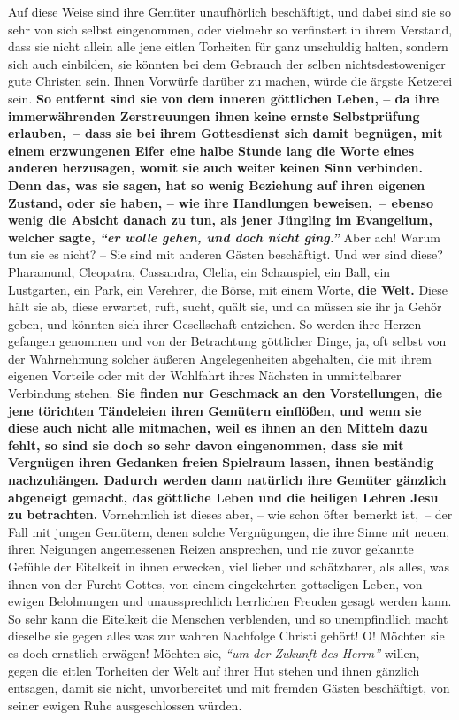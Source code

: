 Auf diese Weise sind ihre Gemüter unaufhörlich beschäftigt, und dabei sind sie
so sehr von sich selbst eingenommen, oder vielmehr so verfinstert in ihrem
Verstand, dass sie nicht allein alle jene eitlen Torheiten für ganz unschuldig
halten, sondern sich auch einbilden, sie könnten bei dem Gebrauch der selben
nichtsdestoweniger gute Christen sein. Ihnen
Vorwürfe
darüber zu machen, würde
die ärgste Ketzerei sein.
\label{ref:17_04_gottesdienst}
\textbf{So entfernt sind sie von dem inneren göttlichen Leben,
-- da ihre immerwährenden Zerstreuungen ihnen keine ernste
Selbstprüfung
erlauben,~-- dass sie bei ihrem Gottesdienst
sich damit begnügen, mit einem
erzwungenen Eifer eine halbe Stunde lang die Worte eines anderen herzusagen,
womit sie auch weiter keinen Sinn verbinden. Denn das, was sie sagen, hat so
wenig Beziehung auf ihren eigenen Zustand, oder sie haben, -- wie ihre
Handlungen beweisen,~-- ebenso wenig die Absicht danach zu tun, als jener
Jüngling im Evangelium, welcher sagte,
\textit{"`er wolle gehen, und doch nicht ging."'}}
Aber ach! Warum tun sie es nicht? -- Sie sind mit anderen Gästen beschäftigt.
Und wer sind diese? Pharamund,
Cleopatra, Cassandra,
Clelia, ein Schauspiel, ein
Ball, ein Lustgarten, ein Park, ein Verehrer, die Börse, mit einem
Worte, \textbf{die
Welt.} Diese hält sie ab, diese erwartet, ruft,
sucht, quält sie, und da müssen
sie ihr ja Gehör geben, und könnten sich ihrer Gesellschaft entziehen. So werden
ihre Herzen gefangen genommen und von der Betrachtung göttlicher Dinge, ja, oft
selbst von der Wahrnehmung solcher äußeren Angelegenheiten abgehalten, die mit
ihrem eigenen Vorteile oder mit der Wohlfahrt ihres Nächsten in unmittelbarer
Verbindung stehen. \textbf{Sie finden nur Geschmack an den Vorstellungen, die
jene
törichten Tändeleien ihren Gemütern einflößen, und wenn sie diese auch nicht
alle mitmachen, weil es ihnen an den Mitteln dazu fehlt, so sind sie doch so
sehr davon eingenommen, dass sie mit Vergnügen ihren Gedanken freien Spielraum
lassen, ihnen beständig nachzuhängen. Dadurch werden dann natürlich ihre
Gemüter gänzlich abgeneigt gemacht, das göttliche Leben und die heiligen Lehren
Jesu zu betrachten.} Vornehmlich ist dieses aber, -- wie schon öfter bemerkt
ist,~-- der Fall mit jungen Gemütern, denen solche Vergnügungen, die ihre Sinne mit
neuen, ihren Neigungen angemessenen Reizen ansprechen, und nie zuvor gekannte
Gefühle der Eitelkeit in ihnen erwecken, viel lieber und schätzbarer, als
alles, was ihnen von der Furcht Gottes, von einem eingekehrten gottseligen
Leben, von ewigen Belohnungen und unaussprechlich herrlichen Freuden gesagt
werden kann. So sehr kann die Eitelkeit die Menschen verblenden, und so
unempfindlich macht dieselbe sie gegen alles was zur wahren Nachfolge Christi
gehört! O! Möchten sie es doch ernstlich erwägen! Möchten sie,
\textit{"`um der Zukunft
des Herrn"'} willen, gegen die eitlen Torheiten der Welt auf ihrer Hut stehen
und ihnen gänzlich entsagen, damit sie nicht, unvorbereitet und mit fremden
Gästen beschäftigt, von seiner ewigen Ruhe ausgeschlossen würden.

